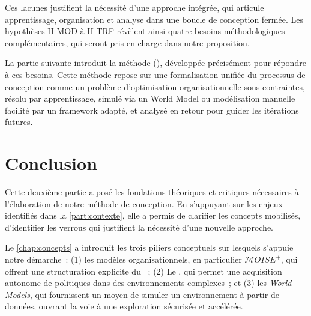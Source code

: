 \noindent
Ces lacunes justifient la nécessité d'une approche intégrée, qui articule apprentissage, organisation et analyse dans une boucle de conception fermée. Les hypothèses H-MOD à H-TRF révèlent ainsi quatre besoins méthodologiques complémentaires, qui seront pris en charge dans notre proposition.

\medskip

\noindent
La partie suivante introduit la méthode \textbf{} (), développée précisément pour répondre à ces besoins. Cette méthode repose sur une formalisation unifiée du processus de conception comme un problème d'optimisation organisationnelle sous contraintes, résolu par apprentissage, simulé via un World Model ou modélisation manuelle facilité par un framework adapté, et analysé en retour pour guider les itérations futures.



\clearpage
\thispagestyle{empty}
\null
\newpage

\chapter*{Conclusion}

\noindent
Cette deuxième partie a posé les fondations théoriques et critiques nécessaires à l'élaboration de notre méthode de conception. En s'appuyant sur les enjeux identifiés dans la \autoref{part:contexte}, elle a permis de clarifier les concepts mobilisés, d'identifier les verrous qui justifient la nécessité d'une nouvelle approche.

\medskip

\noindent
Le \autoref{chap:concepts} a introduit les trois piliers conceptuels sur lesquels s'appuie notre démarche~: (1) les modèles organisationnels, en particulier \textit{$\mathcal{M}OISE^+$}, qui offrent une structuration explicite du ~; (2) Le , qui permet une acquisition autonome de politiques dans des environnements complexes~; et (3) les \textit{World Models}, qui fournissent un moyen de simuler un environnement à partir de données, ouvrant la voie à une exploration sécurisée et accélérée.

